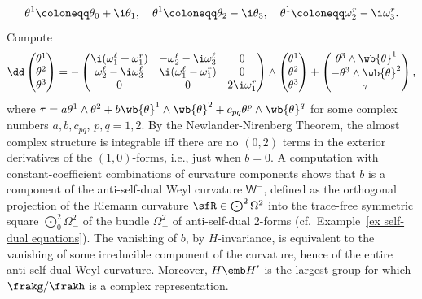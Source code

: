 \begin{example}
    \[\theta^1\coloneqq \theta_0+\i\theta_1, \quad \theta^1\coloneqq \theta_2-\i\theta_3, \quad\theta^1\coloneqq \omega^r_2-\i\omega_3^r.\] 
    Compute 
    \[\dd\begin{pmatrix}
        \theta^1\\\theta^2\\\theta^3
    \end{pmatrix}=
    -\begin{pmatrix}
        \i (\omega^\ell_1+\omega^r_1) & -\omega^\ell_2-\i\omega^\ell_3 & 0\\
        \omega^\ell_2-\i \omega^\ell_3 & \i(\omega^\ell_1-\omega^r_1) & 0\\
        0 & 0 & 2\i \omega^r_1
    \end{pmatrix}\wedge 
    \begin{pmatrix}
        \theta^1\\\theta^2\\\theta^3
    \end{pmatrix}
    +\begin{pmatrix}
        \theta^3\wedge \wb{\theta}^1\\
        -\theta^3\wedge\wb{\theta}^2\\
        \tau
    \end{pmatrix},
    \]
    where $\tau=a\theta^1\wedge \theta^2+b\wb{\theta}^1\wedge\wb{\theta}^2+c_{pq}\theta^p\wedge\wb{\theta}^q$ for some complex numbers $a,b,c_{pq}$, $p,q=1,2$. By the Newlander-Nirenberg Theorem, the almost complex structure is integrable iff there are no $(0,2)$ terms in the exterior derivatives of the $(1,0)$-forms, i.e., just when $b=0$. A computation with constant-coefficient combinations of curvature components shows that $b$ is a component of the anti-self-dual Weyl curvature $\mathsf{W}^-$, defined as the orthogonal projection of the Riemann curvature $\sfR\in \bigodot\nolimits^2\Omega^2$ into the trace-free symmetric square $\bigodot\nolimits^2_0\Omega^2_-$ of the bundle $\Omega^2_-$ of anti-self-dual $2$-forms (cf.\ Example~\ref{ex self-dual equations}). The vanishing of $b$, by $H$-invariance, is equivalent to the vanishing of some irreducible component of the curvature, hence of the entire anti-self-dual Weyl curvature. Moreover, $H\emb H'$ is the largest group for which $\frakg\slash\frakh$ is a complex representation. 
    

\end{example}
